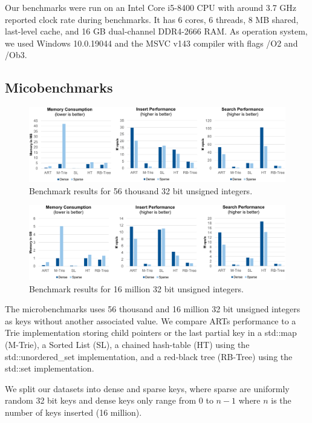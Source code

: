 \documentclass[acmtog, nonacm]{acmart}
\begin{document}
Our benchmarks were run on an Intel Core i5-8400 CPU with around 3.7 GHz reported clock rate during benchmarks.
It has 6 cores, 6 threads, 8 MB shared, last-level cache, and 16 GB dual-channel DDR4-2666 RAM. As operation system, we used Windows 10.0.19044 and the MSVC v143 compiler with flags /O2 and /Ob3.

\subsection{Micobenchmarks}

\begin{figure}
    \centering
    \includegraphics[width=\textwidth]{images/05-art-micro-benchmark-56.PNG}
    \caption{Benchmark results for 56 thousand 32 bit unsigned integers.}
    \label{fig:art-micro-benchmark-56}
\end{figure}

\begin{figure}
    \centering
    \includegraphics[width=\textwidth]{images/06-art-micro-benchmark-16.PNG}
    \caption{Benchmark results for 16 million 32 bit unsigned integers.}
    \label{fig:art-micro-benchmark-16}
\end{figure}

The microbenchmarks uses 56 thousand and 16 million 32 bit unsigned integers as keys without another associated value. We compare ARTs 
performance to a Trie implementation storing child pointers or the last partial key in a std::map (M-Trie), a 
Sorted List (SL), a chained hash-table (HT) using the std::unordered\_set implementation, and a red-black tree 
(RB-Tree) using the std::set implementation.

We split our datasets into dense and sparse keys, where sparse are uniformly random 32 bit keys and dense keys only
range from $0$ to $n-1$ where $n$ is the number of keys inserted (16 million).
\end{document}
